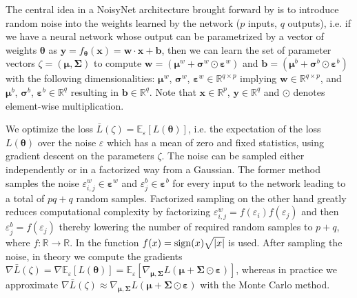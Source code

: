 \noindent The central idea in a NoisyNet architecture brought forward by \cite{noisynet-paper} is to introduce random noise into the weights learned by the network ($p$ inputs, $q$ outputs), i.e. if we have a neural network whose output can be parametrized by a vector of weights $\boldsymbol{\theta}$ as $\textbf{y} = f_{\boldsymbol{\theta}}(\textbf{x}) = \textbf{w} \cdot \textbf{x} + \textbf{b}$, then we can learn the set of parameter vectors $\zeta = (\boldsymbol{\mu}, \boldsymbol{\Sigma})$ to compute $\textbf{w} = (\boldsymbol{\mu}^{w} + \boldsymbol{\sigma}^{w} \odot \boldsymbol{\varepsilon}^{w})$ and $\textbf{b} = (\boldsymbol{\mu}^{b} + \boldsymbol{\sigma}^{b} \odot \boldsymbol{\varepsilon}^{b})$ with the following dimensionalities: $\boldsymbol{\mu}^{w}$, $\boldsymbol{\sigma}^{w}$, $\boldsymbol{\varepsilon}^{w} \in \mathbb{R}^{q \times p}$ implying $\textbf{w} \in \mathbb{R}^{q \times p}$, and $\boldsymbol{\mu}^{b}$, $\boldsymbol{\sigma}^{b}$, $\boldsymbol{\varepsilon}^{b} \in \mathbb{R}^{q}$ resulting in $\textbf{b} \in \mathbb{R}^{q}$. Note that $\textbf{x} \in \mathbb{R}^{p}$, $\textbf{y} \in \mathbb{R}^{q}$ and $\odot$ denotes element-wise multiplication.

\noindent We optimize the loss $\bar{L}(\zeta) = \mathbb{E}_{\varepsilon}[L(\boldsymbol{\theta})]$, i.e. the expectation of the loss $L(\boldsymbol{\theta})$ over the noise $\varepsilon$ which has a mean of zero and fixed statistics, using gradient descent on the parameters $\zeta$. The noise can be sampled either independently or in a factorized way from a Gaussian. The former method samples the noise $\varepsilon^{w}_{i,j} \in \boldsymbol{\varepsilon}^{w}$ and $\varepsilon^{b}_{j} \in \boldsymbol{\varepsilon}^{b}$ for every input to the network leading to a total of $pq + q$ random samples. Factorized sampling on the other hand greatly reduces computational complexity by factorizing $\varepsilon^{w}_{i,j} = f(\varepsilon_{i}) f(\varepsilon_{j})$ and then $\varepsilon^{b}_{j} = f(\varepsilon_{j})$ thereby lowering the number of required random samples to $p + q$, where $f: \mathbb{R} \rightarrow \mathbb{R}$. In \cite{noisynet-paper} the function $f(x) = \operatorname{sign}(x) \sqrt{|x|}$ is used. After sampling the noise, in theory we compute the gradients $\nabla\bar{L}(\zeta) = \nabla\mathbb{E}_{\varepsilon}[L(\boldsymbol{\theta})] = \mathbb{E}_{\varepsilon}[\nabla_{\boldsymbol{\mu}, \boldsymbol{\Sigma}}L(\boldsymbol{\mu} + \boldsymbol{\Sigma} \odot \boldsymbol{\varepsilon})]$, whereas in practice we approximate $\nabla\bar{L}(\zeta) \approx \nabla_{\boldsymbol{\mu}, \boldsymbol{\Sigma}}L(\boldsymbol{\mu} + \boldsymbol{\Sigma} \odot \boldsymbol{\varepsilon})$ with the Monte Carlo method.

